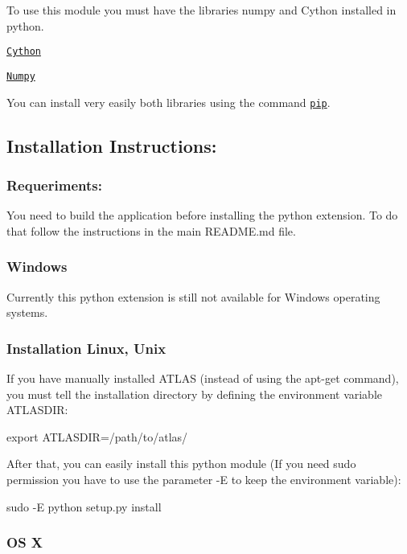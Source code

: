 To use this module you must have the libraries numpy and Cython installed in python.


\begin{DoxyItemize}
\item \href{http://cython.org/}{\tt Cython}
\item \href{http://www.numpy.org/}{\tt Numpy}
\end{DoxyItemize}

You can install very easily both libraries using the command \href{https://pip.pypa.io/en/stable/}{\tt pip}.

\subsection*{Installation Instructions\+:}

\subsubsection*{Requeriments\+:}

You need to build the application before installing the python extension. To do that follow the instructions in the main R\+E\+A\+D\+M\+E.\+md file.

\subsubsection*{Windows}

Currently this python extension is still not available for Windows operating systems.

\subsubsection*{Installation Linux, Unix}

If you have manually installed A\+T\+L\+AS (instead of using the apt-\/get command), you must tell the installation directory by defining the environment variable A\+T\+L\+A\+S\+D\+IR\+: \begin{DoxyVerb}export ATLASDIR=/path/to/atlas/
\end{DoxyVerb}


After that, you can easily install this python module (If you need sudo permission you have to use the parameter -\/E to keep the environment variable)\+: \begin{DoxyVerb}sudo -E python setup.py install
\end{DoxyVerb}


\subsubsection*{OS X}

